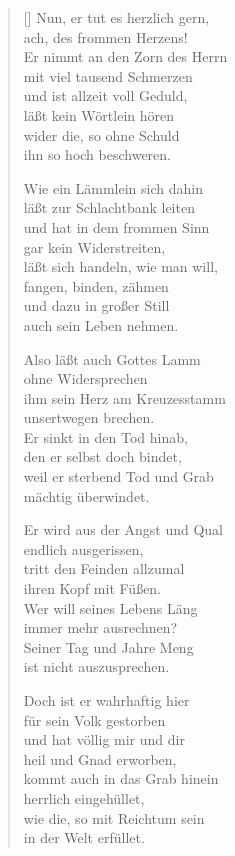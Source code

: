 \begin{multicols}{2}
\begin{verse}[\versewidth]
 Nun, er tut es herzlich gern,\\
ach, des frommen Herzens!\\
Er nimmt an den Zorn des Herrn\\
mit viel tausend Schmerzen\\
und ist allzeit voll Geduld,\\
läßt kein Wörtlein hören\\
wider die, so ohne Schuld\\
ihn so hoch beschweren.

 Wie ein Lämmlein sich dahin\\
läßt zur Schlachtbank leiten\\
und hat in dem frommen Sinn\\
gar kein Widerstreiten,\\
läßt sich handeln, wie man will,\\
fangen, binden, zähmen\\
und dazu in großer Still\\
auch sein Leben nehmen.

 Also läßt auch Gottes Lamm\\
ohne Widersprechen\\
ihm sein Herz am Kreuzesstamm\\
unsertwegen brechen.\\
Er sinkt in den Tod hinab,\\
den er selbst doch bindet,\\
weil er sterbend Tod und Grab\\
mächtig überwindet.

 Er wird aus der Angst und Qual\\
endlich ausgerissen,\\
tritt den Feinden allzumal\\
ihren Kopf mit Füßen.\\
Wer will seines Lebens Läng\\
immer mehr ausrechnen?\\
Seiner Tag und Jahre Meng\\
ist nicht auszusprechen.

 Doch ist er wahrhaftig hier\\
für sein Volk gestorben\\
und hat völlig mir und dir\\
heil und Gnad erworben,\\
kommt auch in das Grab hinein\\
herrlich eingehüllet,\\
wie die, so mit Reichtum sein\\
in der Welt erfüllet.


\end{verse}
\end{multicols}
